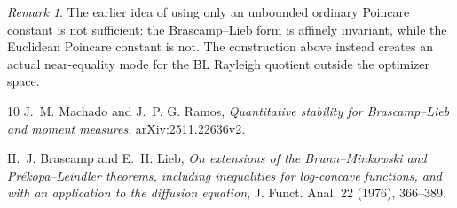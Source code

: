 \documentclass{article}
\theoremstyle{remark}
\newtheorem{remark}[theorem]{Remark}
\begin{document}
\begin{remark}
The earlier idea of using only an unbounded ordinary Poincare constant is not
sufficient: the Brascamp--Lieb form is affinely invariant, while the Euclidean
Poincare constant is not.  The construction above instead creates an actual
near-equality mode for the BL Rayleigh quotient outside the optimizer space.
\end{remark}

\begin{thebibliography}{10}
J.~M. Machado and J.~P. G. Ramos,
\textit{Quantitative stability for Brascamp--Lieb and moment measures},
arXiv:2511.22636v2.

H.~J. Brascamp and E.~H. Lieb,
\textit{On extensions of the Brunn--Minkowski and Pr\'ekopa--Leindler theorems,
including inequalities for log-concave functions, and with an application to the
diffusion equation},
J. Funct. Anal. 22 (1976), 366--389.
\end{thebibliography}
\end{document}
